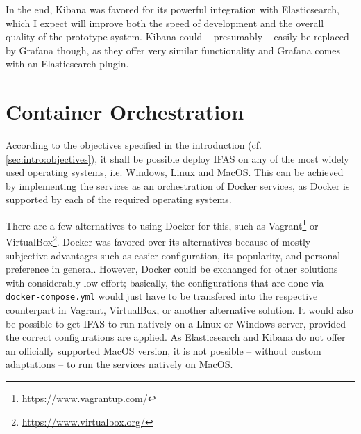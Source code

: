 In the end, Kibana was favored for its powerful integration with Elasticsearch, which I expect will improve both the speed of development and the overall quality of the prototype system.
Kibana could -- presumably -- easily be replaced by Grafana though, as they offer very similar functionality and Grafana comes with an Elasticsearch plugin.

\section{Container Orchestration}

According to the objectives specified in the introduction (cf. \cref{sec:intro:objectives}), it shall be possible deploy \ac{IFAS} on any of the most widely used operating systems, i.e. Windows, Linux and MacOS.
This can be achieved by implementing the services as an orchestration of Docker services, as Docker is supported by each of the required operating systems.

There are a few alternatives to using Docker for this, such as Vagrant\footnote{\url{https://www.vagrantup.com/}} or VirtualBox\footnote{\url{https://www.virtualbox.org/}}.
Docker was favored  over its alternatives because of mostly subjective advantages such as easier configuration, its popularity, and personal preference in general.
However, Docker could be exchanged for other solutions with considerably low effort; basically, the configurations that are done via \texttt{docker-compose.yml} would just have to be transfered into the respective counterpart in Vagrant, VirtualBox, or another alternative solution.
It would also be possible to get \ac{IFAS} to run natively on a Linux or Windows server, provided the correct configurations are applied.
As Elasticsearch and Kibana do not offer an officially supported MacOS version, it is not possible -- without custom adaptations -- to run the services natively on MacOS.
